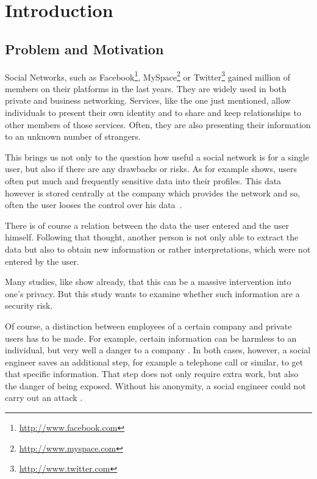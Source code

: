 \chapter{Introduction}
\label{chapter:introduction}

\section{Problem and Motivation}

Social Networks, such as Facebook\footnote{\url{http://www.facebook.com}},
MySpace\footnote{\url{http://www.myspace.com}} or
Twitter\footnote{\url{http://www.twitter.com}} gained million of members on
their platforms in the last years. They are widely used in both private and
business networking. Services, like the one just mentioned, allow individuals
to present their own identity and to share and keep relationships to other
members of those services. Often, they are also presenting their information to
an unknown number of strangers.


This brings us not only to the question how useful a social network is for a
single user, but also if there are any drawbacks or risks.  As for example
\cite{brown2008} shows, users often put much and frequently sensitive data into
their profiles. This data however is stored centrally at the company which
provides the network and so, often the user looses the control over his
data~\cite{fraunhofer2008}.

There is of course a relation between the data the user entered and the user
himself. Following that thought, another person is not only able to extract the
data but also to obtain new information or rather interpretations, which were
not entered by the user.

Many studies, like \cite{fraunhofer2008,gross2005} show already, that this can
be a massive intervention into one's privacy. But this study wants to examine
whether such information are a security risk.

Of course, a distinction between employees of a certain company and private
users has to be made. For example, certain information can be harmless to an
individual, but very well a danger to a company \cite{mitnick2003}. In both
cases, however, a social engineer saves an additional step, for example a
telephone call or similar, to get that specific information. That step does not
only require extra work, but also the danger of being exposed. Without his
anonymity, a social engineer could not carry out an attack \cite{mitnick2003}.

